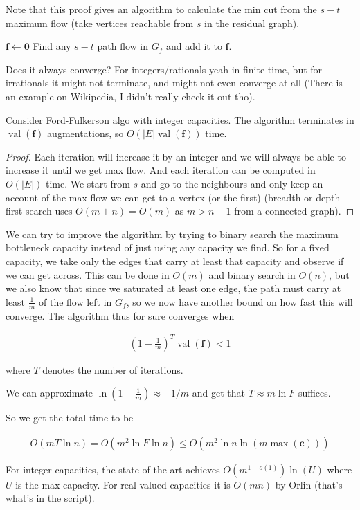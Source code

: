 Note that this proof gives an algorithm to calculate the min cut from the $s-t$ maximum flow (take vertices reachable from $s$ in the residual graph).


\begin{algorithm}
\caption{Ford-Fulkerson Algo}\label{alg:FF}
\begin{algorithmic}
\State $\mathbf{f} \gets \mathbf{0}$
    \State Find any $s-t$ path flow in $G_f$ and add it to $\mathbf{f}$.
\EndWhile
\end{algorithmic}
\end{algorithm}

Does it always converge? For integers/rationals yeah in finite time, but for irrationals it might not terminate, and might not even converge at all (There is an example on Wikipedia, I didn't really check it out tho).

\begin{lema}
    Consider Ford-Fulkerson algo with integer capacities. The algorithm terminates in $\operatorname{val}(\mathbf{f})$ augmentations, so $O(|E| \operatorname{val}(\mathbf{f}))$ time.
\end{lema}

\begin{proof}
    Each iteration will increase it by an integer and we will always be able to increase it until we get max flow. And each iteration can be computed in $O(|E|)$ time. We start from $s$ and go to the neighbours and only keep an account of the max flow we can get to a vertex (or the first) (breadth or depth-first search uses $O(m+n) = O(m)$ as $m>n-1$ from a connected graph).
\end{proof}


We can try to improve the algorithm by trying to binary search the maximum bottleneck capacity instead of just using any capacity we find. So for a fixed capacity, we take only the edges that carry at least that capacity and observe if we can get across. This can be done in $O(m)$ and binary search in $O(n)$, but we also know that since we saturated at least one edge, the path must carry at least $\frac{1}{m}$ of the flow left in $G_f$, so we now have another bound on how fast this will converge. The algorithm thus for sure converges when

\begin{align*}
    \left(1 - \frac{1}{m}\right)^T \operatorname{val}(\mathbf{f}) < 1
\end{align*}

where $T$ denotes the number of iterations.

We can approximate $\ln \left(1-\frac{1}{m}\right) \approx -1/m$ and get that $T \approx m \ln F$ suffices.

So we get the total time to be

\begin{align}
    O(m T \ln n) = O(m^2 \ln F \ln n) \leq O(m^2 \ln n \ln (m \max (\mathbf{c})))
\end{align}

For integer capacities, the state of the art achieves $O(m^{1 + o(1)}) \ln (U)$ where $U$ is the max capacity. For real valued capacities it is $O(mn)$ by Orlin (that's what's in the script).